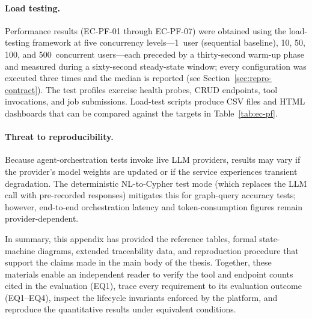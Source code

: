 \documentclass[a4paper,noexaminfo]{sapthesis}
\begin{document}
\paragraph{Load testing.}
Performance results (EC-PF-01 through EC-PF-07) were obtained using the
load-testing framework at five concurrency levels---1~user (sequential
baseline), 10, 50, 100, and 500~concurrent users---each preceded by a
thirty-second warm-up phase and measured during a sixty-second
steady-state window; every configuration was executed three times and
the median is reported (see Section~\ref{sec:repro-contract}).  The test
profiles exercise health probes, CRUD endpoints, tool invocations, and
job submissions.  Load-test scripts produce CSV files and HTML dashboards
that can be compared against the targets in Table~\ref{tab:ec-pf}.

\paragraph{Threat to reproducibility.}
Because agent-orchestration tests invoke live LLM providers, results may
vary if the provider's model weights are updated or if the service
experiences transient degradation.  The deterministic NL-to-Cypher test
mode (which replaces the LLM call with pre-recorded responses) mitigates
this for graph-query accuracy tests; however, end-to-end orchestration
latency and token-consumption figures remain provider-dependent.

\bigskip
\noindent
In summary, this appendix has provided the reference tables, formal
state-machine diagrams, extended traceability data, and reproduction
procedure that support the claims made in the main body of the thesis.
Together, these materials enable an independent reader to verify the
tool and endpoint counts cited in the evaluation (EQ1), trace every
requirement to its evaluation outcome (EQ1--EQ4), inspect the lifecycle
invariants enforced by the platform, and reproduce the quantitative
results under equivalent conditions.


\backmatter



\end{document}
